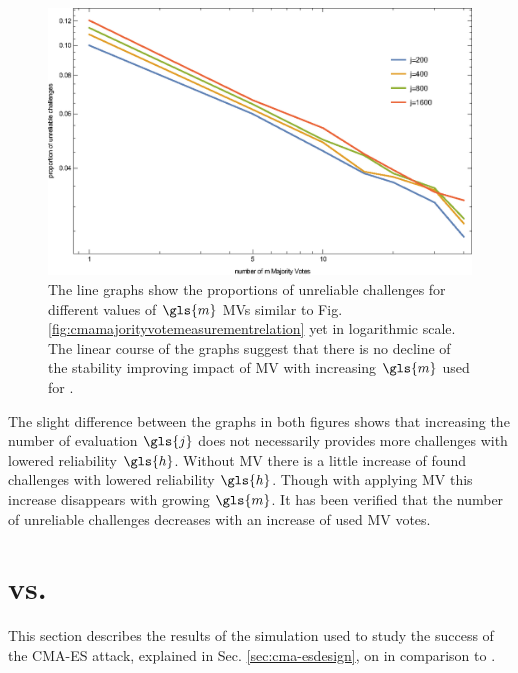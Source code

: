 \begin{figure}[ht]
\includegraphics[width=1.00\textwidth]{images/mv-measurements-unstableChallenges_loglog.eps}
\caption[Proportion of unreliable challenges logarithmic]{The line graphs show the proportions of unreliable challenges for different values of $\gls{m}$ \acp{MV} similar to Fig. \ref{fig:cmamajorityvotemeasurementrelation} yet in logarithmic scale. The linear course of the graphs suggest that there is no decline of the stability improving impact of \ac{MV} with increasing $\gls{m}$ used for \mpufs.}
\label{fig:cmamajorityvotemeasurementrelationloglog}
\end{figure}

The slight difference between the graphs in both figures shows that increasing the number of evaluation $\gls{j}$ does not necessarily provides more challenges with lowered reliability $\gls{h}$.
Without \ac{MV} there is a little increase of found challenges with lowered reliability $\gls{h}$.
Though with applying \ac{MV} this increase disappears with growing $\gls{m}$.
It has been verified that the number of unreliable challenges decreases with an increase of used \ac{MV} votes.



\section{\apufs vs. \mpufs}
\label{sec:arbitervsmajorityarbiter}

This section describes the results of the simulation used to study the success of the \ac{CMA-ES} attack, explained in Sec. \ref{sec:cma-esdesign}, on \mpufs in comparison to \apufs.

